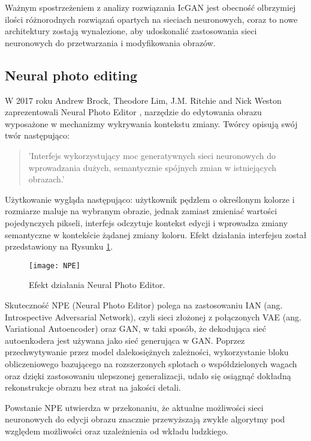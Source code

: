     Ważnym spostrzeżeniem z analizy rozwiązania IcGAN jest obecność
    olbrzymiej ilości różnorodnych rozwiązań opartych na sieciach neuronowych,
    coraz to nowe architektury zostają wynalezione, aby udoskonalić
    zastosowania sieci neuronowych do przetwarzania i modyfikowania obrazów.

  \subsection{Neural photo editing}
    W 2017 roku Andrew Brock, Theodore Lim, J.M. Ritchie and Nick Weston
    zaprezentowali Neural Photo Editor \cite{neural_photo_editor}, narzędzie
    do edytowania obrazu wyposażone w mechanizmy wykrywania kontekstu zmiany.
    Twórcy opisują swój twór następująco:

    \begin{quote}
      'Interfejs wykorzystujący moc generatywnych sieci neuronowych do
      wprowadzania dużych, semantycznie spójnych zmian w istniejących obrazach.'
    \end{quote}

    Użytkowanie wygląda następująco: użytkownik pędzlem o określonym kolorze i
    rozmiarze maluje na wybranym obrazie, jednak zamiast zmieniać wartości
    pojedynczych pikseli, interfejs odczytuje kontekst edycji i wprowadza zmiany
    semantyczne w kontekście żądanej zmiany koloru. Efekt działania interfejsu
    został przedstawiony na Rysunku \ref{fig:npe}.

    \begin{figure}[ht]
      \centering
      \texttt{[image: NPE]}
      \caption[Efekt działania Neural Photo Editor - źródło: \cite{neural_photo_editor}]
      {Efekt działania Neural Photo Editor.}
      \label{fig:npe}
    \end{figure}

    Skuteczność NPE (Neural Photo Editor) polega na zastosowaniu IAN
    (ang. Introspective Adversarial Network), czyli sieci złożonej z połączonych
    VAE (ang. Variational Autoencoder) \cite{vae} oraz GAN, w taki sposób, że dekodująca
    sieć autoenkodera jest używana jako sieć generująca w GAN.
    Poprzez przechwytywanie przez model dalekosiężnych zależności, wykorzystanie
    bloku obliczeniowego bazującego na rozszerzonych splotach o
    współdzielonych wagach oraz dzięki zastosowaniu ulepszonej generalizacji,
    udało się osiągnąć dokładną rekonstrukcje obrazu bez strat na jakości detali.

    Powstanie NPE utwierdza w przekonaniu, że aktualne możliwości sieci
    neuronowych do edycji obrazu znacznie przewyższają zwykłe algorytmy pod
    względem możliwości oraz uzależnienia od wkładu ludzkiego.
